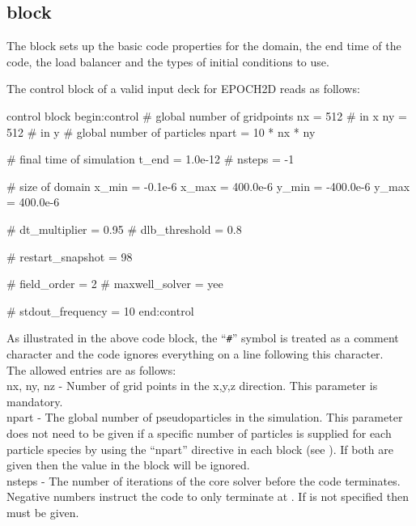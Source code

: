 \subsection{ block}
\label{sec:control_block}
The  block sets up the basic code properties for the
domain, the end time of the code, the load balancer and the types of initial
conditions to use.

The control block of a valid input deck for EPOCH2D reads as follows:
\begin{lboxverbatim}{control block}
begin:control
   # global number of gridpoints
   nx = 512 # in x
   ny = 512 # in y
   # global number of particles
   npart = 10 * nx * ny

   # final time of simulation
   t_end = 1.0e-12
   # nsteps = -1

   # size of domain
   x_min = -0.1e-6
   x_max = 400.0e-6
   y_min = -400.0e-6
   y_max = 400.0e-6

   # dt_multiplier = 0.95
   # dlb_threshold = 0.8

   # restart_snapshot = 98

   # field_order = 2
   # maxwell_solver = yee

   # stdout_frequency = 10
end:control
\end{lboxverbatim}

As illustrated in the above code block, the ``{\texttt{\#}}'' symbol is treated
as a comment character and the code ignores everything on a line following this
character.\\

The allowed entries are as follows:\\

{\emphtext nx, ny, nz} - Number of grid points in the x,y,z direction. This
parameter is mandatory.\\

{\emphtext npart} - The global number of pseudoparticles in the
simulation. This parameter does not need to be given if a specific number
of particles is supplied for each particle species by using the ``npart''
directive in each  block (see ). If both are
given then the value in the  block will be ignored.\\

{\emphtext nsteps} - The number of iterations of the core solver before the
code terminates. Negative numbers instruct the code to only terminate at
. If  is not specified then
 must be given.\\

